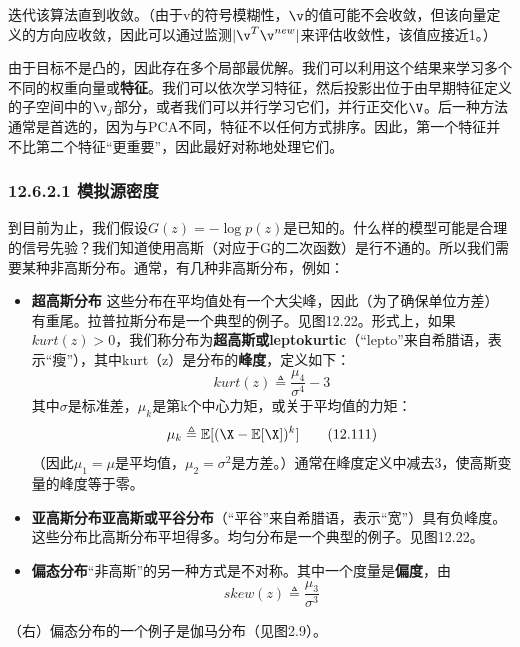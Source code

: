 \documentclass[a4paper]{article}
\begin{document}
迭代该算法直到收敛。（由于v的符号模糊性，$\v$的值可能不会收敛，但该向量定义的方向应收敛，因此可以通过监测$|\v^T\v^{new}|$来评估收敛性，该值应接近1。） 

由于目标不是凸的，因此存在多个局部最优解。我们可以利用这个结果来学习多个不同的权重向量或\textbf{特征}。我们可以依次学习特征，然后投影出位于由早期特征定义的子空间中的$\v_j$部分，或者我们可以并行学习它们，并行正交化$\V$。后一种方法通常是首选的，因为与PCA不同，特征不以任何方式排序。因此，第一个特征并不比第二个特征“更重要”，因此最好对称地处理它们。 

\subsubsection*{12.6.2.1 模拟源密度 }
到目前为止，我们假设$G(z)=-\log p(z)$是已知的。什么样的模型可能是合理的信号先验？我们知道使用高斯（对应于G的二次函数）是行不通的。所以我们需要某种非高斯分布。通常，有几种非高斯分布，例如： 
\begin{itemize}
	\item \textbf{超高斯分布} 这些分布在平均值处有一个大尖峰，因此（为了确保单位方差）有重尾。拉普拉斯分布是一个典型的例子。见图12.22。形式上，如果$kurt(z)>0$，我们称分布为\textbf{超高斯或leptokurtic}（“lepto”来自希腊语，表示“瘦”），其中kurt（z）是分布的\textbf{峰度}，定义如下： 
	\begin{equation}
		kurt(z)\triangleq\frac{\mu_4}{\sigma^4}-3\tag{12.110}
	\end{equation}
	其中$\sigma$是标准差，$\mu_k$是第k个中心力矩，或关于平均值的力矩： 
	\begin{equation}
		\mu_k\triangleq\mathbb{E}[(\X-\mathbb{E}[\X])^k]\tag{12.111}
	\end{equation}
	（因此$\mu_1=\mu$是平均值，$\mu_2=\sigma^2$是方差。）通常在峰度定义中减去3，使高斯变量的峰度等于零。 
	\item \textbf{亚高斯分布亚高斯或平谷分布}（“平谷”来自希腊语，表示“宽”）具有负峰度。这些分布比高斯分布平坦得多。均匀分布是一个典型的例子。见图12.22。 
	\item \textbf{偏态分布}“非高斯”的另一种方式是不对称。其中一个度量是\textbf{偏度}，由 
	\begin{equation}
		skew(z)\triangleq\frac{\mu_3}{\sigma^3}\tag{12.112}
	\end{equation}
\end{itemize}

（右）偏态分布的一个例子是伽马分布（见图2.9）。
\end{document}
